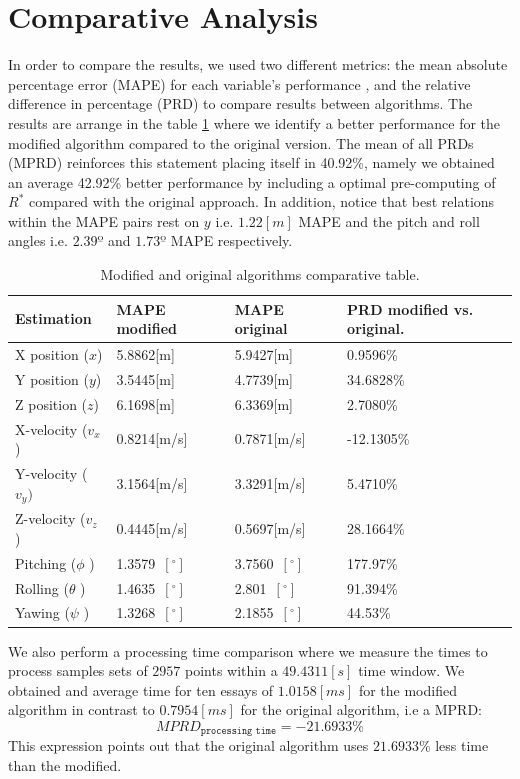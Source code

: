 \documentclass[10pt,conference]{IEEEtran}
\begin{document}
\section{Comparative Analysis}
In order to compare the results, we used two different metrics: the mean absolute percentage error (MAPE) for each variable's performance , and the relative difference in percentage (PRD) to compare results between algorithms. The results are arrange in the table \ref{resultados_tb1} where we identify a better performance for the modified algorithm compared to the original version. The mean of all PRDs (MPRD) reinforces this statement placing itself in 40.92\%, namely we obtained an average 42.92\% better performance by including a optimal pre-computing of $R^*$ compared with the original approach. In addition, notice that  best relations within the MAPE pairs rest on $y$ i.e. $1.22[m]$ MAPE and the pitch and roll angles i.e. $2.39º$ and $1.73º$ MAPE respectively.\par
\begin{table}[!t]
\caption{Modified and original algorithms comparative table.}
\label{resultados_tb1}
\begin{center}\scriptsize
\begin{tabular}{|p{0.7in}|p{0.6in}|p{0.6in}|p{0.7in}|} \hline
\textbf{Estimation}&\textbf{MAPE modified}&\textbf{MAPE original}&\textbf{PRD modified vs. original.} \\ \hline
X position ($x$) &5.8862[m]&5.9427[m]&0.9596\%\\ \hline
Y  position ($y$) &3.5445[m]&4.7739[m]&34.6828\%\\ \hline
Z  position ($z$)&6.1698[m]&6.3369[m]&2.7080\%\\ \hline
X-velocity ($v_x$) &0.8214[m/s]&0.7871[m/s]&{-12.1305\%}\\ \hline
Y-velocity ($v_y)$&3.1564[m/s]&3.3291[m/s]&5.4710\%\\ \hline
Z-velocity ($v_z$)&0.4445[m/s]&0.5697[m/s]&28.1664\%\\ \hline
Pitching ($\phi$ )&1.3579~$[^{\circ}]$&3.7560~$[^{\circ}]$&177.97\%\\ \hline
Rolling ($\theta$ )&1.4635~$[^{\circ}]$&2.801~$[^{\circ}]$&91.394\%\\ \hline
Yawing ($\psi$ )&1.3268~$[^{\circ}]$&2.1855~$[^{\circ}]$&44.53\%\\ \hline
\end{tabular}
\end{center}
\end{table}
We also perform a processing time comparison where we measure the times to process samples sets of $2957$ points within a $49.4311 [s]$ time window. We obtained and average time for ten essays of $1.0158[ms]$ for the modified algorithm in contrast to $0.7954 [ms]$ for the original algorithm, i.e a MPRD:
\begin{equation}
MPRD_{\texttt{processing time}}=-21.6933\%
\end{equation}
This expression points out that the original algorithm uses $21.6933\%$ less time than the modified.
\end{document}
